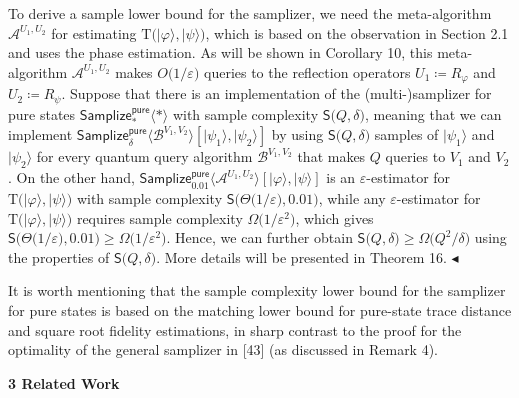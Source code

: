 To derive a sample lower bound for the samplizer, we need the meta-algorithm $\mathcal{A}^{U_{1},U_{2}}$ for estimating $\mathrm{T}\lparen\lvert\varphi\rangle,\lvert\psi\rangle\rparen$, which is based on the observation in Section 2.1 and uses the phase estimation. As will be shown in Corollary 10,
this meta-algorithm $\mathcal{A}^{U_{1},U_{2}}$ makes $O\lparen 1/\varepsilon\rparen$ queries to the reflection operators $U_{1}\coloneqq R_{\varphi}$ and $U_{2}\coloneqq R_{\psi}$.
Suppose that there is an implementation of the (multi-)samplizer for pure states $\mathsf{Samplize}^{\mathsf{pure}}_{*}\langle*\rangle$ with sample complexity $\mathsf{S}\lparen Q,\delta\rparen$, meaning that we can implement $\mathsf{Samplize}^{\mathsf{pure}}_{\delta}\langle\mathcal{B}^{V_{1},V_{2}}\rangle[\lvert\psi_{1}\rangle,\lvert\psi_{2}\rangle]$ by using $\mathsf{S}\lparen Q,\delta\rparen$ samples of $\lvert\psi_{1}\rangle$ and $\lvert\psi_{2}\rangle$ for every quantum query algorithm $\mathcal{B}^{V_{1},V_{2}}$ that makes $Q$ queries to $V_{1}$ and $V_{2}$.
On the other hand, $\mathsf{Samplize}^{\mathsf{pure}}_{0.01}\langle\mathcal{A}^{U_{1},U_{2}}\rangle[\lvert\varphi\rangle,\lvert\psi\rangle]$ is an $\varepsilon$-estimator for $\mathrm{T}\lparen\lvert\varphi\rangle,\lvert\psi\rangle\rparen$ with sample complexity $\mathsf{S}\lparen\Theta\lparen 1/\varepsilon\rparen,0.01\rparen$, while any $\varepsilon$-estimator for $\mathrm{T}\lparen\lvert\varphi\rangle,\lvert\psi\rangle\rparen$ requires sample complexity $\Omega\lparen 1/\varepsilon^{2}\rparen$, which gives $\mathsf{S}\lparen\Theta\lparen 1/\varepsilon\rparen,0.01\rparen\geq\Omega\lparen 1/\varepsilon^{2}\rparen$.
Hence, we can further obtain $\mathsf{S}\lparen Q,\delta\rparen\geq\Omega\lparen Q^{2}/\delta\rparen$ using the properties of $\mathsf{S}\lparen Q,\delta\rparen$.
More details will be presented in Theorem 16.
$\blacktriangleleft$\par




It is worth mentioning that the sample complexity lower bound for the samplizer for pure states is based on the matching lower bound for pure-state trace distance and square root fidelity estimations, in sharp contrast to the proof for the optimality of the general samplizer in [43] (as discussed in Remark 4).\par







\par\medskip\noindent\textbf{
3 Related Work}\par




